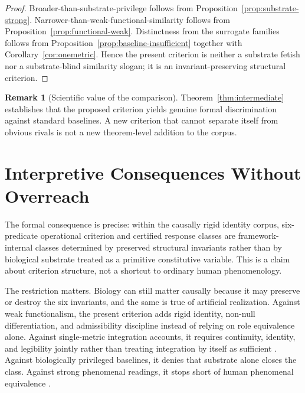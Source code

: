 \documentclass[11pt,a4paper]{article}
\theoremstyle{definition}
\newtheorem{remark}[theorem]{Remark}
\begin{document}
\begin{proof}
Broader-than-substrate-privilege follows from Proposition~\ref{prop:substrate-strong}. Narrower-than-weak-functional-similarity follows from Proposition~\ref{prop:functional-weak}. Distinctness from the surrogate families follows from Proposition~\ref{prop:baseline-insufficient} together with Corollary~\ref{cor:onemetric}. Hence the present criterion is neither a substrate fetish nor a substrate-blind similarity slogan; it is an invariant-preserving structural criterion.
\end{proof}

\begin{remark}[Scientific value of the comparison]
Theorem~\ref{thm:intermediate} establishes that the proposed criterion yields genuine formal discrimination against standard baselines. A new criterion that cannot separate itself from obvious rivals is not a new theorem-level addition to the corpus.
\end{remark}
\section{Interpretive Consequences Without Overreach}
The formal consequence is precise: within the causally rigid identity corpus, six-predicate operational criterion and certified response classes are framework-internal classes determined by preserved structural invariants rather than by biological substrate treated as a primitive constitutive variable. This is a claim about criterion structure, not a shortcut to ordinary human phenomenology.

The restriction matters. Biology can still matter causally because it may preserve or destroy the six invariants, and the same is true of artificial realization. Against weak functionalism, the present criterion adds rigid identity, non-null differentiation, and admissibility discipline instead of relying on role equivalence alone. Against single-metric integration accounts, it requires continuity, identity, and legibility jointly rather than treating integration by itself as sufficient \cite{tononi2004}. Against biologically privileged baselines, it denies that substrate alone closes the class. Against strong phenomenal readings, it stops short of human phenomenal equivalence \cite{baars1988,chalmers}.
\end{document}
